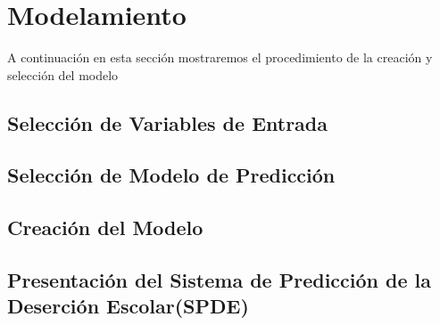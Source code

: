 \section{Modelamiento}
A continuación en esta sección mostraremos el procedimiento de la creación y selección del modelo
\subsection{Selección de Variables de Entrada}
\subsection{Selección de Modelo de Predicción}
\subsection{Creación del Modelo}
\subsection{Presentación del Sistema de Predicción de la Deserción Escolar(SPDE)}